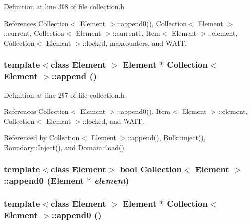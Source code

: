 Definition at line 308 of file collection.h.

References Collection$<$ Element $>$::append0(), Collection$<$ Element $>$::current, Collection$<$ Element $>$::current1, Item$<$ Element $>$::element, Collection$<$ Element $>$::locked, maxcounters, and WAIT.\hypertarget{classCollection_fcf23b25470a1695983118c153244838}{
\subsubsection[{append}]{\setlength{\rightskip}{0pt plus 5cm}template$<$class Element $>$ Element $\ast$ {\bf Collection}$<$ Element $>$::append ()}}
\label{classCollection_fcf23b25470a1695983118c153244838}




Definition at line 297 of file collection.h.

References Collection$<$ Element $>$::append0(), Item$<$ Element $>$::element, Collection$<$ Element $>$::locked, and WAIT.

Referenced by Collection$<$ Element $>$::append(), Bulk::inject(), Boundary::Inject(), and Domain::load().\hypertarget{classCollection_b89740f405067954a0e0c62d8f5b4faa}{
\subsubsection[{append0}]{\setlength{\rightskip}{0pt plus 5cm}template$<$class Element$>$ bool {\bf Collection}$<$ Element $>$::append0 (Element $\ast$ {\em element})}}
\label{classCollection_b89740f405067954a0e0c62d8f5b4faa}


\hypertarget{classCollection_527bca208e29a6fe75053e054cfc1835}{
\subsubsection[{append0}]{\setlength{\rightskip}{0pt plus 5cm}template$<$class Element $>$ Element $\ast$ {\bf Collection}$<$ Element $>$::append0 ()}}
\label{classCollection_527bca208e29a6fe75053e054cfc1835}




